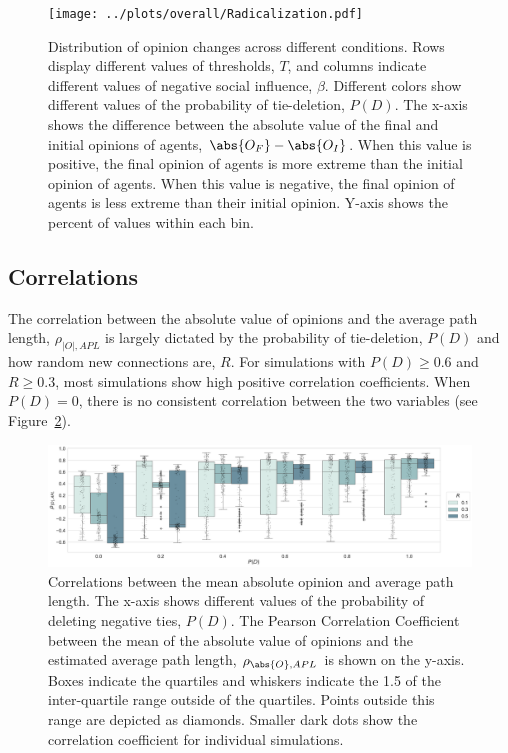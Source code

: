 \documentclass[11pt]{article}
\DeclarePairedDelimiter{\abs}\lvert\rvert
\begin{document}
\begin{figure}[H]
    \centering
    \texttt{[image: ../plots/overall/Radicalization.pdf]}
  \caption{Distribution of opinion changes across different conditions. Rows display different values of thresholds, $T$, and columns indicate different values of negative social influence, $\beta$. Different colors show different values of the probability of tie-deletion, $P(D)$. The x-axis shows the difference between the absolute value of the final and initial opinions of agents, $\abs{O_F} - \abs{O_I}$. When this value is positive, the final opinion of agents is more extreme than the initial opinion of agents. When this value is negative, the final opinion of agents is less extreme than their initial opinion. Y-axis shows the percent of values within each bin. }
  \label{fig:radicalization}
\end{figure}

\subsection{Correlations}
The correlation between the absolute value of opinions and the average path length, $\rho_{|O|, APL}$ is largely dictated by the probability of tie-deletion, $P(D)$ and how random new connections are, $R$. For simulations with $P(D) \geq 0.6$ and $R \geq 0.3$, most simulations show high positive correlation coefficients. When $P(D) = 0$, there is no consistent correlation between the two variables (see Figure~\ref{fig:corr_abs_path}). 

\begin{figure}[H]
    \centering
    \includegraphics[width=.99\linewidth]{../plots/overall/Tie_Dissolution_Correlations_Boxplot_Full.pdf}
  \caption{Correlations between the mean absolute opinion and average path length. The x-axis shows different values of the probability of deleting negative ties, $P(D)$. The Pearson Correlation Coefficient between the mean of the absolute value of opinions and the estimated average path length, $\rho_{\abs{O}, APL}$ is shown on the y-axis. Boxes indicate the quartiles and whiskers indicate the 1.5 of the inter-quartile range outside of the quartiles. Points outside this range are depicted as diamonds. Smaller dark dots show the correlation coefficient for individual simulations.}
  \label{fig:corr_abs_path}
\end{figure}
\end{document}
